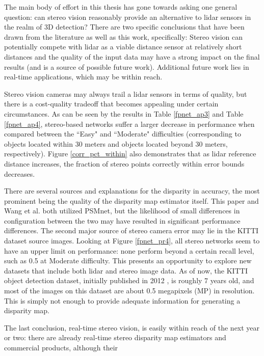 The main body of effort in this thesis has gone towards asking one general question: can stereo vision reasonably provide an alternative to lidar sensors in the realm of 3D detection? There are two specific conclusions that have been drawn from the literature as well as this work, specifically: Stereo vision can potentially compete with lidar as a viable distance sensor at relatively short distances and the quality of the input data may have a strong impact on the final results (and is a source of possible future work). Additional future work lies in real-time applications, which may be within reach. 

Stereo vision cameras may always trail a lidar sensors in terms of quality, but there is a cost-quality tradeoff that becomes appealing under certain circumstances. As can be seen by the results in Table \ref{fpnet_ap3} and Table \ref{fpnet_ap4}, stereo-based networks suffer a larger decrease in performance when compared between the ``Easy" and ``Moderate" difficulties (corresponding to objects located within 30 meters and objects located beyond 30 meters, respectively). Figure \ref{corr_pct_within} also demonstrates that as lidar reference distance increases, the fraction of stereo points correctly within error bounds decreases. 

There are several sources and explanations for the disparity in accuracy, the most prominent being the quality of the disparity map estimator itself. This paper and Wang et al. \cite{wang_pseudo-lidar_2019} both utilized PSMnet, but the likelihood of small differences in configuration between the two may have resulted in significant performance differences. The second major source of stereo camera error may lie in the KITTI dataset source images. Looking at Figure \ref{fpnet_pr4}, all stereo networks seem to have an upper limit on performance: none perform beyond a certain recall level, such as 0.5 at Moderate difficulty. This presents an opportunity to explore new datasets that include both lidar and stereo image data. As of now, the KITTI object detection dataset, initially published in 2012 \cite{geiger_are_2012}, is roughly 7 years old, and most of the images on this dataset are about 0.5 megapixels (MP) in resolution. This is simply not enough to provide adequate information for generating a disparity map.

The last conclusion, real-time stereo vision, is easily within reach of the next year or two: there are already real-time stereo disparity map estimators and commercial products, although their 

